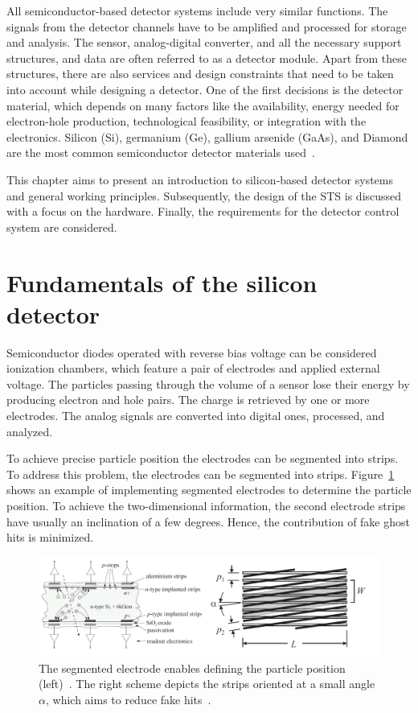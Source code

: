 
All semiconductor-based detector systems include very similar functions. The signals from the detector channels have to be amplified and processed for storage and analysis. The sensor, analog-digital converter, and all the necessary support structures, and data  are often referred to as a detector module. Apart from these structures, there are also services and design constraints that need to be taken into account while designing a detector. One of the first decisions is the detector material, which depends on many factors like the availability, energy needed for electron-hole production, technological feasibility, or integration with the electronics. Silicon (Si), germanium (Ge), gallium arsenide (GaAs), and Diamond are the most common semiconductor detector materials used~\cite{Lutz:1999wg,Hartmann:2017gzy}.


This chapter aims to present an introduction to silicon-based detector systems and general working principles. Subsequently, the design of the \gls{STS} is discussed with a focus on the hardware. Finally, the requirements for the detector control system are considered. 

\section{Fundamentals of the silicon detector}
Semiconductor diodes operated with reverse bias voltage can be considered ionization chambers, which feature a pair of electrodes and applied external voltage. The particles passing through the volume of a sensor lose their energy by producing electron and hole pairs. The charge is retrieved by one or more electrodes. The analog signals are converted into digital ones, processed, and analyzed.

To achieve precise particle position the electrodes can be segmented into strips. To address this problem, the electrodes can be segmented into strips. Figure~\ref{fig_si} shows an example of implementing segmented electrodes to determine the particle position. To achieve the two-dimensional information, the second electrode strips have usually an inclination of a few degrees. Hence, the contribution of fake ghost hits is minimized.  

\begin{figure}[!h]
\centering
\includegraphics[width=0.95\columnwidth]{Chapter2/images/silicons.png}
\caption{The segmented electrode enables defining the particle position (left)~\cite{Sokolov:2006vdx}. The right scheme depicts the strips oriented at a small angle $\alpha$, which aims to reduce fake hits~\cite{Spieler}.}
\label{fig_si}
\end{figure}
\newpage

